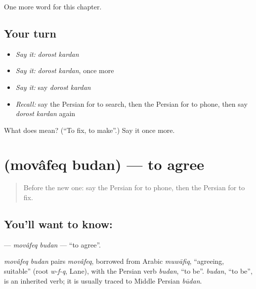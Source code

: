 \begin{grammarlens}[title={What you've built}]
One more word for this chapter.
\end{grammarlens}

\subsection*{Your turn}
\begin{itemize}
\raggedright
  \item \emph{Say it:} \emph{dorost kardan}
  \item \emph{Say it:} \emph{dorost kardan}, once more
  \item \emph{Say it:} say \emph{dorost kardan}
  \item \emph{Recall:} say the Persian for to search, then the Persian for to phone, then say \emph{dorost kardan} again
\end{itemize}

\begin{tcolorbox}[breakable,colback=teal!4,colframe=teal!35!black,title={Before you move on}]
What does   mean? (\textquotedblleft{}To fix, to make\textquotedblright{}.) Say it once more.
\end{tcolorbox}
\section[\texorpdfstring{\fa{موافق} \fa{بودن} (movâfeq budan)}{موافق بودن (movâfeq budan)}]{  (movâfeq budan) — to agree}

\label{lesson:FA-C258-movafeq-budan}



\begin{quote}
Before the new one: say the Persian for to phone, then the Persian for to fix.
\end{quote}

\subsection*{You'll want to know:  }
\textbf{ } — \emph{movâfeq budan} — \textquotedblleft{}to agree\textquotedblright{}.

\begin{cousinweb}
\emph{movâfeq budan} pairs \emph{movâfeq}, borrowed from Arabic \emph{muwāfiq}, \textquotedblleft{}agreeing, suitable\textquotedblright{} (root \emph{w-f-q}, Lane), with the Persian verb \emph{budan}, \textquotedblleft{}to be\textquotedblright{}. \emph{budan}, \textquotedblleft{}to be\textquotedblright{}, is an inherited verb; it is usually traced to Middle Persian \emph{būdan}.
\end{cousinweb}


